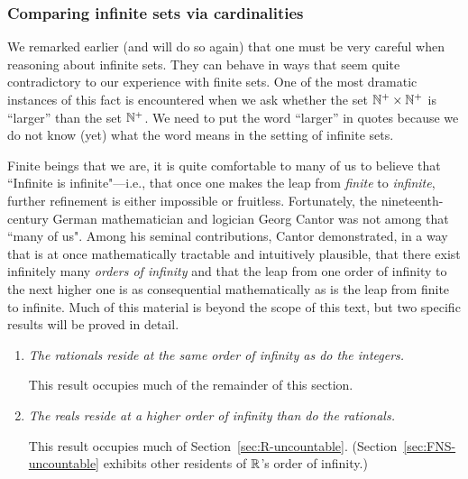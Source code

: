 \subsubsection{Comparing infinite sets via cardinalities}
\label{sec:compare-sets-via-card}

We remarked earlier (and will do so again) that one must be very careful when reasoning about infinite sets.  They can behave in ways that seem quite contradictory to our experience with finite sets.  One of the most dramatic instances of this fact is encountered when we ask whether the set $\mathbb{N}^+ \times \mathbb{N}^+$ is ``larger'' than the set $\mathbb{N}^+$.  We need to put the word ``larger'' in quotes because we do not know (yet) what the word means in the setting of infinite sets.

\smallskip

  

Finite beings that we are, it is quite comfortable to many of us to believe that ``Infinite is infinite"---i.e., that once one makes the leap from {\em finite} to {\em infinite}, further refinement is either impossible or fruitless.  Fortunately, the nineteenth-century German mathematician and logician Georg Cantor was not among that ``many of us".  Among his seminal contributions, Cantor demonstrated, in a way that is at once mathematically tractable and intuitively plausible, that there exist infinitely many {\em orders of infinity} and that the leap from one order of infinity to the next higher one is as consequential mathematically as is the leap from finite to infinite.  Much of this material is beyond the scope of this text, but two specific results will be proved in detail.
\begin{enumerate}
\item
{\em The rationals reside at the same order of infinity as do the integers.}

\smallskip

This result occupies much of the remainder of this section.
\medskip\item
{\em The reals reside at a higher order of infinity than do the rationals.}

\smallskip

This result occupies much of Section~\ref{sec:R-uncountable}.  (Section~\ref{sec:FNS-uncountable} exhibits other residents of $\mathbb{R}$'s order of infinity.)
\end{enumerate}

